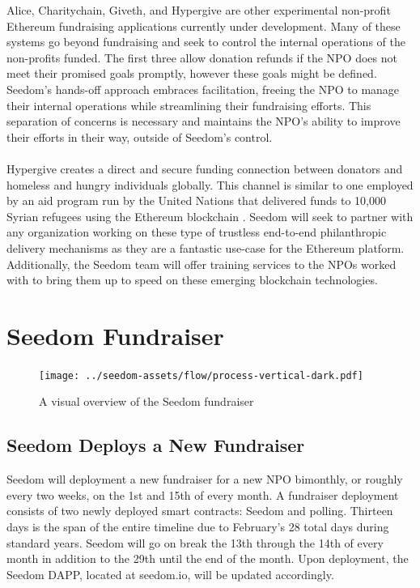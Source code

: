 \documentclass[11pt]{article}
\begin{document}
Alice, Charitychain, Giveth, and Hypergive are other experimental non-profit Ethereum fundraising applications currently under development. Many of these systems go beyond fundraising and seek to control the internal operations of the non-profits funded. The first three allow donation refunds if the NPO does not meet their promised goals promptly, however these goals might be defined. Seedom's hands-off approach embraces facilitation, freeing the NPO to manage their internal operations while streamlining their fundraising efforts. This separation of concerns is necessary and maintains the NPO's ability to improve their efforts in their way, outside of Seedom's control.\\\\
Hypergive creates a direct and secure funding connection between donators and homeless and hungry individuals globally. This channel is similar to one employed by an aid program run by the United Nations that delivered funds to 10,000 Syrian refugees using the Ethereum blockchain \cite{6}. Seedom will seek to partner with any organization working on these type of trustless end-to-end philanthropic delivery mechanisms as they are a fantastic use-case for the Ethereum platform. Additionally, the Seedom team will offer training services to the NPOs worked with to bring them up to speed on these emerging blockchain technologies.

\section{Seedom Fundraiser}

\begin{figure}[H]
\begin{center}
\texttt{[image: ../seedom-assets/flow/process-vertical-dark.pdf]}
\caption{A visual overview of the Seedom fundraiser}
\end{center}
\end{figure}

\subsection{Seedom Deploys a New Fundraiser}

Seedom will deployment a new fundraiser for a new NPO bimonthly, or roughly every two weeks, on the 1st and 15th of every month. A fundraiser deployment consists of two newly deployed smart contracts: Seedom and polling. Thirteen days is the span of the entire timeline due to February's 28 total days during standard years. Seedom will go on break the 13th through the 14th of every month in addition to the 29th until the end of the month. Upon deployment, the Seedom DAPP, located at seedom.io, will be updated accordingly.
\end{document}

